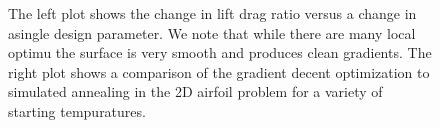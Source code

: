 \documentclass{article} %
\begin{document}
\begin{figure}[h]
\begin{center}
\end{center}
\caption{The left plot shows the change in lift drag ratio versus a change in asingle design parameter. We note that while there are many local optimu the surface is very smooth and produces clean gradients. The right plot shows a comparison of the gradient decent optimization to simulated annealing in the 2D airfoil problem for a variety of starting tempuratures.}
\end{figure}
\end{document}

